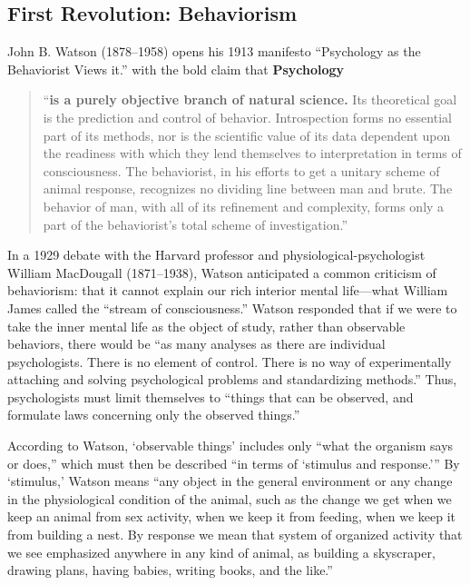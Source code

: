 \begin{refsection}
\subsection{First Revolution: Behaviorism}
\label{firstrevolution:behaviorism}

John B. Watson (1878--1958) opens his 1913 manifesto “Psychology as the Behaviorist Views it.” with the bold claim that \textbf{Psychology}

\begin{quote}

“\textbf{is a purely objective branch of natural science.} Its theoretical goal is the prediction and control of behavior. Introspection forms no essential part of its methods, nor is the scientific value of its data dependent upon the readiness with which they lend themselves to interpretation in terms of consciousness. The behaviorist, in his efforts to get a unitary scheme of animal response, recognizes no dividing line between man and brute. The behavior of man, with all of its refinement and complexity, forms only a part of the behaviorist's total scheme of investigation.” ~\citep[p. 158]{Watson:1913tq}
\end{quote}

In a 1929 debate with the Harvard professor and physiological-psychologist William MacDougall (1871--1938), Watson anticipated a common criticism of behaviorism: that it cannot explain our rich interior mental life---what William James called the “stream of consciousness.” Watson responded that if we were to take the inner mental life as the object of study, rather than observable behaviors, there would be “as many analyses as there are individual psychologists. There is no element of control. There is no way of experimentally attaching and solving psychological problems and standardizing methods.” Thus, psychologists must limit themselves to “things that can be observed, and formulate laws concerning only the observed things.” ~\citep{Watson:iMwU-3B8}

According to Watson, ‘observable things’ includes only “what the organism says or does,” which must then be described “in terms of ‘stimulus and response.’” By ‘stimulus,’ Watson means “any object in the general environment or any change in the physiological condition of the animal, such as the change we get when we keep an animal from sex activity, when we keep it from feeding, when we keep it from building a nest. By response we mean that system of organized activity that we see emphasized anywhere in any kind of animal, as building a skyscraper, drawing plans, having babies, writing books, and the like.”


\end{refsection}
